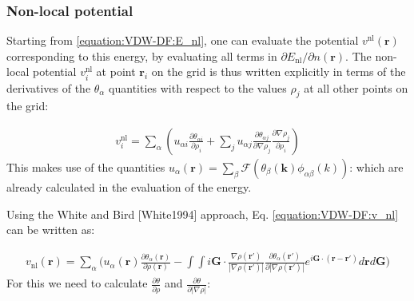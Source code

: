 \documentclass[letterpaper,10pt,english]{sphinxmanual}
\begin{document}
\subsubsection{Non-local potential}
\label{\detokenize{VDW-DF:non-local-potential}}
Starting from \eqref{equation:VDW-DF:E_nl}, one can evaluate the potential
\(v^{\mathrm{nl}}({\mathbf{r}})\) corresponding to this energy, by
evaluating all terms in \(\partial E_{\mathrm{nl}} /
\partial n({\mathbf{r}})\). The non-local potential
\(v_i^{\mathrm{nl}}\) at point \({\mathbf{r}}_i\) on the grid is
thus written explicitly in terms of the derivatives of the
\(\theta_{\alpha}\) quantities with respect to the values
\(\rho_j\) at all other points on the grid:

\label{\detokenize{VDW-DF:equation-v-nl}}\begin{equation}\label{equation:VDW-DF:v_nl}
\begin{split}v_i^{\mathrm{nl}} = \sum_{\alpha}(u_{\alpha i}{\frac{\partial{\theta_{\alpha i}}}{\partial{\rho_i}}}+\sum_j u_{\alpha j}
{\frac{\partial{\theta_{\alpha j}}}{\partial{\nabla\rho_j}}}{\frac{\partial{\nabla\rho_j}}{\partial{\rho_i}}})\end{split}
\end{equation}
This makes use of the quantities
\(u_\alpha({\mathbf{r}})= \sum_{\beta}\mathcal{F}(\theta_{\beta}(\mathbf{k})\phi_{\alpha\beta}(k))\):
which are already calculated in the evaluation of the energy.

Using the White and Bird {[}White1994{]} approach, Eq.
\eqref{equation:VDW-DF:v_nl} can be written as:

\label{\detokenize{VDW-DF:equation-v-nl-wnb}}\begin{equation}\label{equation:VDW-DF:v_nl_wnb}
\begin{split}v_{\mathrm{nl}}({\mathbf{r}}) = \sum_{\alpha} \Big(
  u_{\alpha}({\mathbf{r}}){\frac{\partial{\theta_{\alpha}({\mathbf{r}})}}{\partial{\rho({\mathbf{r}})}}}
  - \int\int i\mathbf{G}\cdot \frac{\nabla\rho({\mathbf{r}}')}{|\nabla\rho({\mathbf{r}}')|}
  {\frac{\partial{\theta_{\alpha}({\mathbf{r}}')}}{\partial{|\nabla\rho({\mathbf{r}}')|}}}e^{i\mathbf{G}\cdot ({\mathbf{r}}-{\mathbf{r}}')} d{\mathbf{r}}d\mathbf{G}
  \Big)\end{split}
\end{equation}
For this we need to calculate
\({\frac{\partial{\theta}}{\partial{\rho}}}\) and
\({\frac{\partial{\theta}}{\partial{{|\nabla{\rho}|}}}}\):
\end{document}
